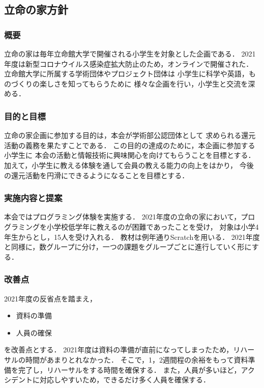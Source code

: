 \subsection*{立命の家方針}


\subsubsection*{概要}
立命の家は毎年立命館大学で開催される小学生を対象とした企画である．
2021年度は新型コロナウイルス感染症拡大防止のため，オンラインで開催された．
立命館大学に所属する学術団体やプロジェクト団体は
小学生に科学や英語，ものづくりの楽しさを知ってもらうために
様々な企画を行い，小学生と交流を深める．

\subsubsection*{目的と目標}
立命の家企画に参加する目的は，本会が学術部公認団体として
求められる還元活動の義務を果たすことである．
この目的の達成のために，本企画に参加する小学生に
本会の活動と情報技術に興味関心を向けてもらうことを目標とする．
加えて，小学生に教える体験を通して会員の教える能力の向上をはかり，
今後の還元活動を円滑にできるようになることを目標とする．

\subsubsection*{実施内容と提案}
本会ではプログラミング体験を実施する．
2021年度の立命の家において，プログラミングを小学校低学年に教えるのが困難であったことを受け，
対象は小学4年生からとし，15人を受け入れる．
教材は例年通りScratchを用いる．
2021年度と同様に，数グループに分け，一つの課題をグループごとに進行していく形にする．

\subsubsection*{改善点}
2021年度の反省点を踏まえ，
\begin{itemize}
  \item 資料の準備
  \item 人員の確保
\end{itemize}
を改善点とする．
2021年度は資料の準備が直前になってしまったため，リハーサルの時間があまりとれなかった．
そこで，1，2週間程の余裕をもって資料準備を完了し，リハーサルをする時間を確保する．
また，人員が多いほど，アクシデントに対応しやすいため，できるだけ多く人員を確保する．

